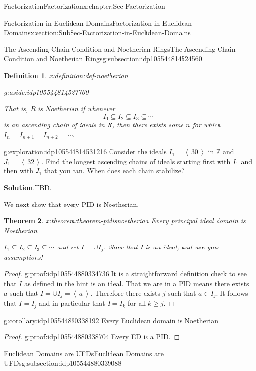 \documentclass[oneside,10pt,]{book}
\newcommand{\blocktitlefont}{\relax}
\numberwithin{equation}{section}
\renewcommand{\geq}{\geqslant}
\newcommand{\ideal}[1]{\left\langle\, #1 \,\right\rangle}
\def\Z{{\mathbb Z}}
\newtheorem{theorem}{Theorem}[section]
\newtheorem{definition}[theorem]{Definition}
\begin{document}
\begin{chapterptx}{Factorization}{}{Factorization}{}{}{x:chapter:Sec-Factorization}
\begin{sectionptx}{Factorization in Euclidean Domains}{}{Factorization in Euclidean Domains}{}{}{x:section:SubSec-Factorization-in-Euclidean-Domains}
\begin{subsectionptx}{The Ascending Chain Condition and Noetherian Rings}{}{The Ascending Chain Condition and Noetherian Rings}{}{}{g:subsection:idp105544814524560}
\begin{definition}{}{x:definition:def-noetherian}
\begin{aside}{}{g:aside:idp105544814527760}
\end{aside}
 That is, \(R\) is Noetherian if whenever%
\begin{equation*}
I_1 \subseteq I_2\subseteq I_3\subseteq \cdots
\end{equation*}
is an ascending chain of ideals in \(R\), then there exists some \(n\) for which \(I_n = I_{n+1} = I_{n+2} = \cdots\).%
\end{definition}
%
\begin{exploration}{}{g:exploration:idp105544814531216}%
Consider the ideals \(I_1 = \ideal{30}\) in \(\Z\) and \(J_1 = \ideal{32}\). Find the longest ascending chains of ideals starting first with \(I_1\) and then with \(J_1\) that you can. When does each chain stabilize?%
\par\smallskip%
\noindent\textbf{\blocktitlefont Solution}.\hypertarget{g:solution:idp105544880332048}{}\quad{}TBD.\end{exploration}%
We next show that every PID is Noetherian.%
\begin{theorem}{}{}{x:theorem:theorem-pidisnoetherian}%
Every principal ideal domain is Noetherian.%
\par\smallskip%
\noindentLet \(I_1\subseteq I_2\subseteq I_3 \subseteq \cdots\) and set \(I = \cup I_j\). Show that \(I\) is an ideal, and use your assumptions!%
\end{theorem}
\begin{proof}{}{g:proof:idp105544880334736}
It is a straightforward definition check to see that \(I\) as defined in the hint is an ideal. That we are in a PID means there exists \(a\) such that \(I=\cup I_j=\ideal{a}\). Therefore there exists \(j\) such that \(a\in I_j\). It follows that \(I=I_j\) and in particular that \(I=I_k\) for all \(k\geq j\).%
\end{proof}
\begin{corollary}{}{}{g:corollary:idp105544880338192}%
Every Euclidean domain is Noetherian.%
\end{corollary}
\begin{proof}{}{g:proof:idp105544880338704}
Every ED is a PID.%
\end{proof}
\end{subsectionptx}
%
%
\typeout{************************************************}
\typeout{************************************************}
%
\begin{subsectionptx}{Euclidean Domains are UFDs}{}{Euclidean Domains are UFDs}{}{}{g:subsection:idp105544880339088}

\end{subsectionptx}
\end{sectionptx}
\end{chapterptx}
\end{document}
